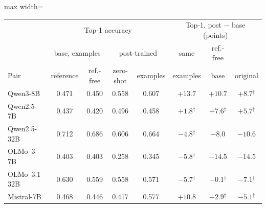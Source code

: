 \documentclass[wcp]{jmlr}
\begin{document}
\begin{table}[t]
\centering\small
\begin{adjustbox}{max width=\linewidth}
\begin{tabular}{lccccccc}
\toprule
 & \multicolumn{4}{c}{Top-1 accuracy} & \multicolumn{3}{c}{Top-1, post $-$ base (points)} \\
 & \multicolumn{2}{c}{base, examples} & \multicolumn{2}{c}{post-trained} & same & ref.-free & \\
Pair & reference & ref.-free & zero-shot & examples & examples & base & original \\
\midrule
Qwen3-8B & 0.471 & 0.450 & 0.558 & 0.607 & $+13.7$ & $+10.7$ & $+8.7$$^{\dagger}$ \\
Qwen2.5-7B & 0.437 & 0.420 & 0.496 & 0.458 & $+1.8$$^{\dagger}$ & $+7.6$$^{\dagger}$ & $+5.7$$^{\dagger}$ \\
Qwen2.5-32B & 0.712 & 0.686 & 0.606 & 0.664 & $-4.8$$^{\dagger}$ & $-8.0$ & $-10.6$ \\
OLMo~3 7B & 0.403 & 0.403 & 0.258 & 0.345 & $-5.8$$^{\dagger}$ & $-14.5$ & $-14.5$ \\
OLMo~3.1 32B & 0.630 & 0.559 & 0.558 & 0.571 & $-5.7$$^{\dagger}$ & $-0.1$$^{\dagger}$ & $-7.1$$^{\dagger}$ \\
Mistral-7B & 0.468 & 0.446 & 0.417 & 0.577 & $+10.8$ & $-2.9$$^{\dagger}$ & $-5.1$$^{\dagger}$ \\
\bottomrule
\end{tabular}
\end{adjustbox}


\end{table}
\end{document}
